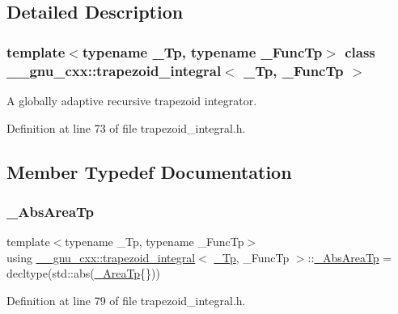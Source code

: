 \subsection{Detailed Description}
\subsubsection*{template$<$typename \+\_\+\+Tp, typename \+\_\+\+Func\+Tp$>$\newline
class \+\_\+\+\_\+gnu\+\_\+cxx\+::trapezoid\+\_\+integral$<$ \+\_\+\+Tp, \+\_\+\+Func\+Tp $>$}

A globally adaptive recursive trapezoid integrator. 

Definition at line 73 of file trapezoid\+\_\+integral.\+h.



\subsection{Member Typedef Documentation}
\mbox{\label{class____gnu__cxx_1_1trapezoid__integral_a14ad7fdce0a3abc725d8d07adb5d340e}} 
\subsubsection{\texorpdfstring{\+\_\+\+Abs\+Area\+Tp}{\_AbsAreaTp}}
{\footnotesize\ttfamily template$<$typename \+\_\+\+Tp, typename \+\_\+\+Func\+Tp$>$ \\
using \hyperlink{class____gnu__cxx_1_1trapezoid__integral}{\+\_\+\+\_\+gnu\+\_\+cxx\+::trapezoid\+\_\+integral}$<$ \hyperlink{namespace____gnu__cxx_a3b19a9c800ca194374ef9172290f7d79}{\+\_\+\+Tp}, \+\_\+\+Func\+Tp $>$\+::\hyperlink{class____gnu__cxx_1_1trapezoid__integral_a14ad7fdce0a3abc725d8d07adb5d340e}{\+\_\+\+Abs\+Area\+Tp} =  decltype(std\+::abs(\hyperlink{class____gnu__cxx_1_1trapezoid__integral_a41c7c672204caf0e1b842c3664aca85f}{\+\_\+\+Area\+Tp}\{\}))}



Definition at line 79 of file trapezoid\+\_\+integral.\+h.

\mbox{\label{class____gnu__cxx_1_1trapezoid__integral_a41c7c672204caf0e1b842c3664aca85f}} 
